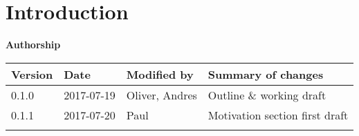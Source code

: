 \section{Introduction}\label{introduction}

\textbf{Authorship}

\begin{longtable}[]{@{}llll@{}}
\toprule
\begin{minipage}[b]{0.10\columnwidth}\raggedright\strut
Version\strut
\end{minipage} & \begin{minipage}[b]{0.06\columnwidth}\raggedright\strut
Date\strut
\end{minipage} & \begin{minipage}[b]{0.15\columnwidth}\raggedright\strut
Modified by\strut
\end{minipage} & \begin{minipage}[b]{0.23\columnwidth}\raggedright\strut
Summary of changes\strut
\end{minipage}\tabularnewline
\midrule
\endhead
\begin{minipage}[t]{0.10\columnwidth}\raggedright\strut
0.1.0\strut
\end{minipage} & \begin{minipage}[t]{0.06\columnwidth}\raggedright\strut
2017-07-19\strut
\end{minipage} & \begin{minipage}[t]{0.15\columnwidth}\raggedright\strut
Oliver, Andres\strut
\end{minipage} & \begin{minipage}[t]{0.23\columnwidth}\raggedright\strut
Outline \& working draft\strut
\end{minipage}\tabularnewline
\begin{minipage}[t]{0.10\columnwidth}\raggedright\strut
0.1.1\strut
\end{minipage} & \begin{minipage}[t]{0.06\columnwidth}\raggedright\strut
2017-07-20\strut
\end{minipage} & \begin{minipage}[t]{0.15\columnwidth}\raggedright\strut
Paul\strut
\end{minipage} & \begin{minipage}[t]{0.23\columnwidth}\raggedright\strut
Motivation section first draft\strut
\end{minipage}\tabularnewline
\begin{minipage}[t]{0.10\columnwidth}\raggedright\strut

\end{minipage}
\end{longtable}
